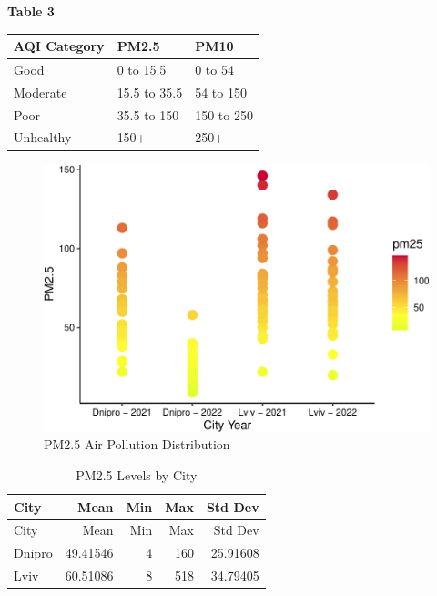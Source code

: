 \documentclass[
  12pt,
]{article}
\begin{document}
\textbf{Table 3}

\begin{longtable}[]{@{}lll@{}}
\toprule
AQI Category & PM2.5 & PM10 \\
\midrule
\endhead
Good & 0 to 15.5 & 0 to 54 \\
Moderate & 15.5 to 35.5 & 54 to 150 \\
Poor & 35.5 to 150 & 150 to 250 \\
Unhealthy & 150+ & 250+ \\
\bottomrule
\end{longtable}

\newpage

\begin{figure}
\centering
\includegraphics{Fontanie_Gordon_Weinberg_Project_files/figure-latex/plot of PM25 air pollution by cityyear-1.pdf}
\caption{PM2.5 Air Pollution Distribution}
\end{figure}

\hfill\break

\begin{longtable}[]{@{}lrrrr@{}}
\caption{PM2.5 Levels by City}\tabularnewline
\toprule
City & Mean & Min & Max & Std Dev \\
\midrule
\endfirsthead
\toprule
City & Mean & Min & Max & Std Dev \\
\midrule
\endhead
Dnipro & 49.41546 & 4 & 160 & 25.91608 \\
Lviv & 60.51086 & 8 & 518 & 34.79405 \\
\bottomrule
\end{longtable}

\newpage
\end{document}
